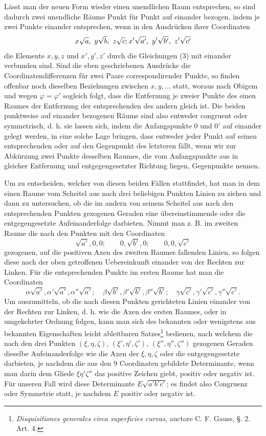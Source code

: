 \documentclass[11pt]{article}
\begin{document}
Lässt man der neuen Form wieder einen unendlichen Raum entsprechen, so sind dadurch zwei unendliche Räume Punkt für Punkt auf einander bezogen, indem je zwei Punkte einander entsprechen, wenn in den Ausdrücken ihrer Coordinaten
\[
 x\sqrt a,\ y\sqrt b,\ z\sqrt c;\\ x'\sqrt{a'},\ y'\sqrt{b'},\ z'\sqrt{c'}
\]
die Elemente $x,y,z$ und $x',y',z'$ durch die Gleichungen (3) mit einander verbunden sind. Sind die eben geschriebenen Ausdrücke die Coordinatendifferenzen für zwei Paare correspondirender Punkte, so finden offenbar noch dieselben Beziehungen zwischen $x,y,\ldots$ statt, woraus nach Obigem und wegen $\varphi=\varphi'$ sogleich folgt, dass die Entfernung je zweier Punkte des einen Raumes der Entfernung der entsprechenden des andern gleich ist. Die beiden punktweise auf einander bezogenen Räume sind also entweder congruent oder symmetrisch, d. h. sie lassen sich, indem die Anfangspunkte $0$ und $0'$ auf einander gelegt werden, in eine solche Lage bringen, dass entweder jeder Punkt auf seinen entsprechenden oder auf den Gegenpunkt des letzteren fällt, wenn wir zur Abkürzung zwei Punkte desselben Raumes, die vom Anfangspunkte aus in gleicher Entfernung und entgegengesetzter Richtung liegen, Gegenpunkte nennen.

Um zu entscheiden, welcher von diesen beiden Fällen stattfindet, hat man in dem einen Raume vom Scheitel aus nach drei beliebigen Punkten Linien zu ziehen und dann zu untersuchen, ob die im andern von seinem Scheitel aus nach den entsprechenden Punkten gezogenen Geraden eine übereinstimmende oder die entgegengesetzte Aufeinanderfolge darbieten. Nimmt man z. B. im zweiten Raume die nach den Punkten mit den Coordinaten
\[
 \sqrt{a'},0,0;\qquad 0,\sqrt{b'},0;\qquad 0,0,\sqrt{c'}
\]
gezogenen, auf die positiven Axen des zweiten Raumes fallenden Linien, so folgen diese nach der oben getroffenen Uebereinkunft einander von der Rechten zur Linken. Für die entsprechenden Punkte im ersten Raume hat man die Coordinaten
\[
 \alpha\sqrt{a'},\alpha'\sqrt{a'},\alpha''\sqrt{a'};\quad
 \beta\sqrt{b'},\beta'\sqrt{b'},\beta''\sqrt{b'};\quad
 \gamma\sqrt{c'},\gamma'\sqrt{c'},\gamma''\sqrt{c'}.
\]
Um auszumitteln, ob die nach diesen Punkten gerichteten Linien einander von der Rechten zur Linken, d. h. wie die Axen des ersten Raumes, oder in umgekehrter Ordnung folgen, kann man sich des bekannten oder wenigstens aus bekannten Eigenschaften leicht ableitbaren Satzes\footnote{\emph{Disquisitiones generales circa superficies curvas}, auctore C. F. Gauss, §. 2. Art. 4.} bedienen, nach welchem die nach den drei Punkten $(\xi,\eta,\zeta)$, $(\xi',\eta',\zeta')$, $(\xi'',\eta'',\zeta'')$ gezogenen Geraden dieselbe Aufeinanderfolge wie die Axen der $\xi,\eta,\zeta$ oder die entgegengesetzte darbieten, je nachdem die aus den 9 Coordinaten gebildete Determinante, wenn man darin dem Gliede $\xi\eta'\zeta''$ das positive Zeichen giebt, positiv oder negativ ist. Für unseren Fall wird diese Determinante $E\sqrt{a'b'c'}$; es findet also Congruenz oder Symmetrie statt, je nachdem $E$ positiv oder negativ ist.
\end{document}
